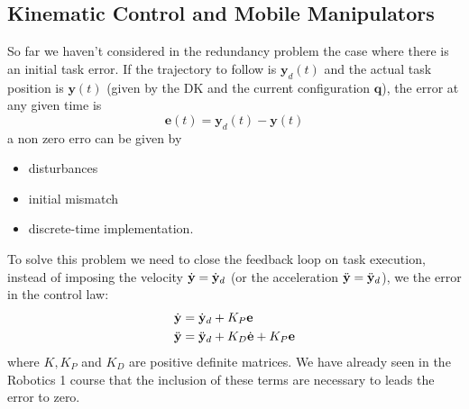 \documentclass[10pt, a4paper]{report}
\newcommand{\y}{{\mathbf y}}
\newcommand{\q}{{\mathbf q}}
\begin{document}
\subsection{Kinematic Control and Mobile Manipulators}
So far we haven't considered in the redundancy problem the case where there is an initial task error. If the trajectory to follow is $\y_d(t)$ and the actual task position is $\y(t)$ (given by the DK and the current configuration $\q$), the error at any given time is\begin{equation}
    \mathbf e(t)=\y_d(t)-\y(t)
\end{equation} 
a non zero erro can be given by\begin{itemize}
    \item disturbances 
    \item initial mismatch 
    \item discrete-time implementation.
\end{itemize}
To solve this problem we need to close the feedback loop on task execution, instead of imposing the velocity ${\dot{\mathbf y}}={\dot{\mathbf y}}_d$ (or the acceleration ${\ddot{\mathbf y}}={\ddot{\mathbf y}}_d$), we the error in the control law:\begin{align}
    &{\dot{\mathbf y}}={\dot{\mathbf y}}_d+K_P\mathbf e\\ 
    &{\ddot{\mathbf y}}={\ddot{\mathbf y}}_d+K_D\dot{\mathbf e}+K_P\mathbf e
\end{align}
where $K,K_P$ and $K_D$ are positive definite matrices. We have already seen in the Robotics 1 course that the inclusion of these terms are necessary to leads the error to zero.\bigskip
\end{document}
